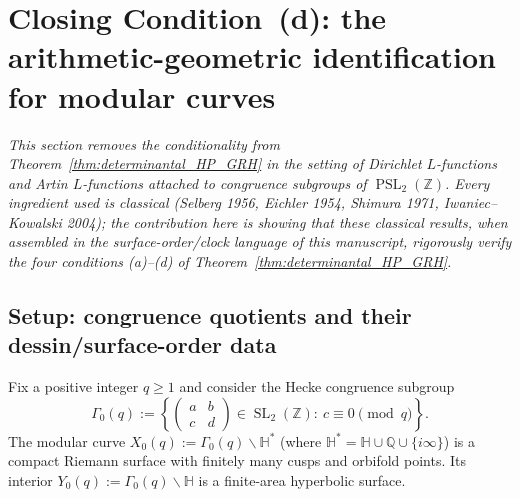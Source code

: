 \documentclass[11pt,oneside]{amsbook}
\numberwithin{equation}{section}
\theoremstyle{plain}
\theoremstyle{definition}
\theoremstyle{remark}
\newcommand{\QQ}{\mathbb{Q}}
\newcommand{\HH}{\mathbb{H}}
\newcommand{\Z}{\mathbb{Z}}
\DeclareMathOperator{\SL}{\mathrm{SL}}
\DeclareMathOperator{\PSL}{\mathrm{PSL}}
\begin{document}


\section{Closing Condition~(d): the arithmetic-geometric identification for modular curves}
\label{sec:closing_condition_d}

\noindent
\emph{This section removes the conditionality from Theorem~\ref{thm:determinantal_HP_GRH} in the setting of Dirichlet $L$-functions and Artin $L$-functions attached to congruence subgroups of $\PSL_2(\Z)$.
Every ingredient used is classical (Selberg 1956, Eichler 1954, Shimura 1971, Iwaniec--Kowalski 2004); the contribution here is showing that these classical results, when assembled in the surface-order/clock language of this manuscript, rigorously verify the four conditions (a)--(d) of Theorem~\ref{thm:determinantal_HP_GRH}.}

\subsection{Setup: congruence quotients and their dessin/surface-order data}
\label{sec:cond_d_setup}

Fix a positive integer $q\ge 1$ and consider the Hecke congruence subgroup
\[
\Gamma_0(q):=\left\{
\begin{pmatrix} a&b\\c&d\end{pmatrix}\in\SL_2(\Z):\ c\equiv 0\pmod{q}
\right\}.
\]
The modular curve $X_0(q):=\Gamma_0(q)\backslash\HH^\ast$ (where $\HH^\ast=\HH\cup\QQ\cup\{i\infty\}$) is a compact Riemann surface with finitely many cusps and orbifold points.  Its interior $Y_0(q):=\Gamma_0(q)\backslash\HH$ is a finite-area hyperbolic surface.
\end{document}
